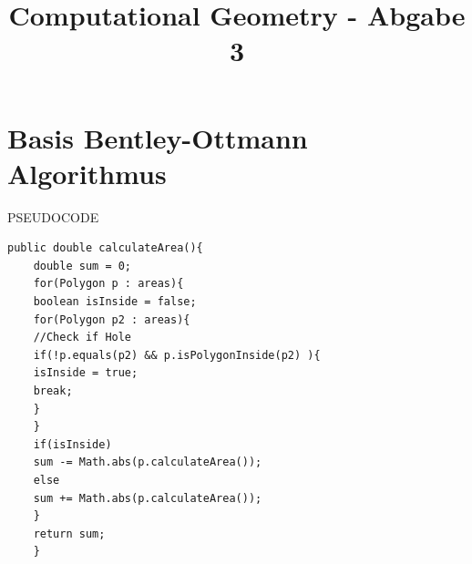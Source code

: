 \documentclass[conference]{IEEEtran}
\begin{document}
	
	\title{Computational Geometry - Abgabe 3}
	
	\author{
	}
	
	\maketitle
	
	\begin{abstract}
		
		
	\end{abstract}
	
	\section{Basis Bentley-Ottmann Algorithmus}
	PSEUDOCODE
	\begin{lstlisting}[basicstyle=\tiny]
	public double calculateArea(){
	double sum = 0;
	for(Polygon p : areas){
	boolean isInside = false;
	for(Polygon p2 : areas){
	//Check if Hole
	if(!p.equals(p2) && p.isPolygonInside(p2) ){ 
	isInside = true;
	break;
	}   
	}
	if(isInside)
	sum -= Math.abs(p.calculateArea());
	else
	sum += Math.abs(p.calculateArea());
	}
	return sum;
	}
	\end{lstlisting}
	
\end{document}
